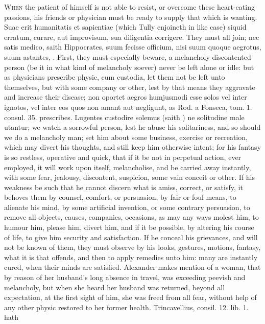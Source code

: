 {\lettrine{W}{hen} the patient of himself is not able to resist, or overcome these
heart-eating passions, his friends or physician must be ready to supply
that which is wanting. Suae erit humanitatis et sapientiae (which
 Tully enjoineth in like case) siquid erratum, curare, aut
improvisum, sua diligentia corrigere. They must all join; nec satis
medico, saith  Hippocrates, suum fecisse officium, nisi suum
quoque aegrotus, suum astantes, \etc{}. First, they must especially beware,
a melancholy discontented person (be it in what kind of melancholy
soever) never be left alone or idle: but as physicians prescribe
physic, cum custodia, let them not be left unto themselves, but with
some company or other, lest by that means they aggravate and increase
their disease; non oportet aegros humjusmodi esse solos vel inter
ignotos, vel inter eos quos non amant aut negligunt, as Rod. a Fonseca,
tom. 1. consul. 35. prescribes. Lugentes custodire solemus (saith
\Seneca) ne solitudine male utantur; we watch a sorrowful person,
lest he abuse his solitariness, and so should we do a melancholy man;
set him about some business, exercise or recreation, which may divert
his thoughts, and still keep him otherwise intent; for his fantasy is
so restless, operative and quick, that if it be not in perpetual
action, ever employed, it will work upon itself, melancholise, and be
carried away instantly, with some fear, jealousy, discontent,
suspicion, some vain conceit or other. If his weakness be such that he
cannot discern what is amiss, correct, or satisfy, it behoves them by
counsel, comfort, or persuasion, by fair or foul means, to alienate his
mind, by some artificial invention, or some contrary persuasion, to
remove all objects, causes, companies, occasions, as may any ways
molest him, to humour him, please him, divert him, and if it be
possible, by altering his course of life, to give him security and
satisfaction. If he conceal his grievances, and will not be known of
them, they must observe by his looks, gestures, motions, fantasy,
what it is that offends, and then to apply remedies unto him: many are
instantly cured, when their minds are satisfied. Alexander makes
mention of a woman, that by reason of her husband's long absence in
travel, was exceeding peevish and melancholy, but when she heard her
husband was returned, beyond all expectation, at the first sight of
him, she was freed from all fear, without help of any other physic
restored to her former health. Trincavellius, consil. 12. lib. 1. hath
}
